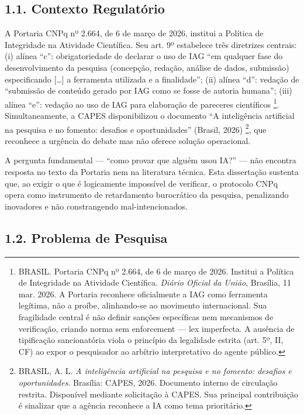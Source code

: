 \documentclass[
  12pt,
  a4paper,
  brazil,
  twoside
]{report}
\begin{document}
\subsection{1.1. Contexto Regulatório}\label{contexto-regulatuxf3rio}

A Portaria CNPq nº 2.664, de 6 de março de 2026, institui a Política de
Integridade na Atividade Científica. Seu art. 9º estabelece três
diretrizes centrais: (i) alínea ``c'': obrigatoriedade de declarar o uso
de IAG ``em qualquer fase do desenvolvimento da pesquisa (concepção,
redação, análise de dados, submissão) especificando {[}\ldots{]} a
ferramenta utilizada e a finalidade''; (ii) alínea ``d'': vedação de
``submissão de conteúdo gerado por IAG como se fosse de autoria
humana''; (iii) alínea ``e'': vedação ao uso de IAG para elaboração de
pareceres científicos \footnote{BRASIL. Portaria CNPq nº 2.664, de 6 de
  março de 2026. Institui a Política de Integridade na Atividade
  Científica. \emph{Diário Oficial da União}, Brasília, 11 mar. 2026. A
  Portaria reconhece oficialmente a IAG como ferramenta legítima, não a
  proíbe, alinhando-se ao movimento internacional. Sua fragilidade
  central é não definir sanções específicas nem mecanismos de
  verificação, criando norma sem enforcement --- lex imperfecta. A
  ausência de tipificação sancionatória viola o princípio da legalidade
  estrita (art. 5º, II, CF) ao expor o pesquisador ao arbítrio
  interpretativo do agente público.}. Simultaneamente, a CAPES
disponibilizou o documento ``A inteligência artificial na pesquisa e no
fomento: desafios e oportunidades'' (Brasil, 2026) \footnote{BRASIL, A.
  L. \emph{A inteligência artificial na pesquisa e no fomento: desafios
  e oportunidades}. Brasília: CAPES, 2026. Documento interno de
  circulação restrita. Disponível mediante solicitação à CAPES. Sua
  principal contribuição é sinalizar que a agência reconhece a IA como
  tema prioritário.}, que reconhece a urgência do debate mas não oferece
solução operacional.

A pergunta fundamental --- ``como provar que alguém usou IA?'' --- não
encontra resposta no texto da Portaria nem na literatura técnica. Esta
dissertação sustenta que, ao exigir o que é logicamente impossível de
verificar, o protocolo CNPq opera como instrumento de retardamento
burocrático da pesquisa, penalizando inovadores e não constrangendo
mal-intencionados.

\subsection{1.2. Problema de Pesquisa}\label{problema-de-pesquisa}
\end{document}
